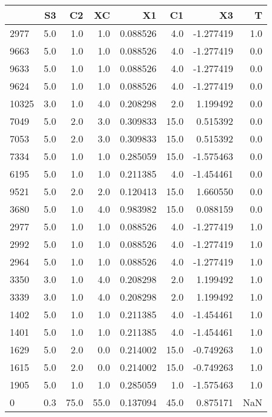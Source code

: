\begin{tabular}{lrrrrrrr}
\toprule
{} &   S3 &    C2 &    XC &        X1 &    C1 &        X3 &    T \\
\midrule
2977  &  5.0 &   1.0 &   1.0 &  0.088526 &   4.0 & -1.277419 &  1.0 \\
9663  &  5.0 &   1.0 &   1.0 &  0.088526 &   4.0 & -1.277419 &  0.0 \\
9633  &  5.0 &   1.0 &   1.0 &  0.088526 &   4.0 & -1.277419 &  0.0 \\
9624  &  5.0 &   1.0 &   1.0 &  0.088526 &   4.0 & -1.277419 &  0.0 \\
10325 &  3.0 &   1.0 &   4.0 &  0.208298 &   2.0 &  1.199492 &  0.0 \\
7049  &  5.0 &   2.0 &   3.0 &  0.309833 &  15.0 &  0.515392 &  0.0 \\
7053  &  5.0 &   2.0 &   3.0 &  0.309833 &  15.0 &  0.515392 &  0.0 \\
7334  &  5.0 &   1.0 &   1.0 &  0.285059 &  15.0 & -1.575463 &  0.0 \\
6195  &  5.0 &   1.0 &   1.0 &  0.211385 &   4.0 & -1.454461 &  0.0 \\
9521  &  5.0 &   2.0 &   2.0 &  0.120413 &  15.0 &  1.660550 &  0.0 \\
3680  &  5.0 &   1.0 &   4.0 &  0.983982 &  15.0 &  0.088159 &  0.0 \\
2977  &  5.0 &   1.0 &   1.0 &  0.088526 &   4.0 & -1.277419 &  1.0 \\
2992  &  5.0 &   1.0 &   1.0 &  0.088526 &   4.0 & -1.277419 &  1.0 \\
2964  &  5.0 &   1.0 &   1.0 &  0.088526 &   4.0 & -1.277419 &  1.0 \\
3350  &  3.0 &   1.0 &   4.0 &  0.208298 &   2.0 &  1.199492 &  1.0 \\
3339  &  3.0 &   1.0 &   4.0 &  0.208298 &   2.0 &  1.199492 &  1.0 \\
1402  &  5.0 &   1.0 &   1.0 &  0.211385 &   4.0 & -1.454461 &  1.0 \\
1401  &  5.0 &   1.0 &   1.0 &  0.211385 &   4.0 & -1.454461 &  1.0 \\
1629  &  5.0 &   2.0 &   0.0 &  0.214002 &  15.0 & -0.749263 &  1.0 \\
1615  &  5.0 &   2.0 &   0.0 &  0.214002 &  15.0 & -0.749263 &  1.0 \\
1905  &  5.0 &   1.0 &   1.0 &  0.285059 &   1.0 & -1.575463 &  1.0 \\
0     &  0.3 &  75.0 &  55.0 &  0.137094 &  45.0 &  0.875171 &  NaN \\
\bottomrule
\end{tabular}
